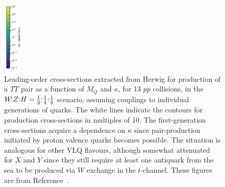 \begin{figure}[tbp]
\vspace{-0.4cm}
\includegraphics[height=3.5cm]{Figures/VLQ/xsScans/3rdGen/cbar.pdf} %
\caption{Leading-order cross-sections extracted from Herwig for production of a $TT$ pair as a
  function of $M_Q$ and $\kappa$, for \unit{13}{\TeV} $pp$ collisions, in the
  $\text{$W\!$:$Z$:$H$} = \text{$\tfrac{1}{2}$:$\tfrac{1}{4}$:$\tfrac{1}{4}$}$ scenario, assuming couplings to individual generations of
  quarks.  The white lines indicate the contours for production cross-sections
  in multiples of 10. The first-generation cross-sections acquire a dependence
  on $\kappa$ since pair-production initiated by proton valence quarks becomes
  possible.  The situation is analogous for other VLQ flavours, although
  somewhat attenuated for $X$ and $Y$ since they still require at least one
  antiquark from the sea to be produced via $W$ exchange in the $t$-channel. These figures are from Reference~\cite{VLQ_contur}.}
\label{fig:TTproduction}
\end{figure}

